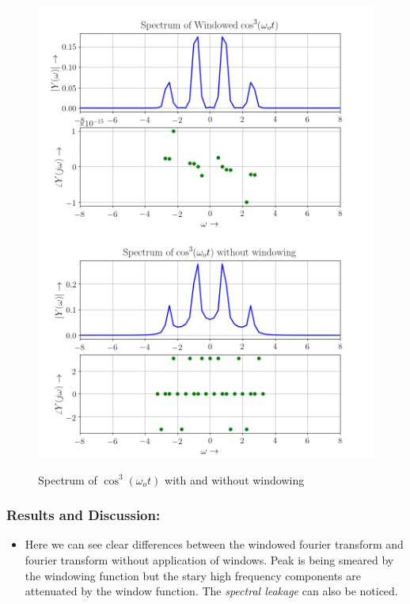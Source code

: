 \documentclass[11pt, a4paper]{article}
\begin{document}
  \newpage
  \begin{figure}[!tbh]
    \centering
    \includegraphics[scale=0.6]{./../Extras/fig10-8.png}  %
    \includegraphics[scale=0.6]{./../Extras/fig10-9.png}  %
    \caption{Spectrum of $\cos^3(\omega_o t)$ with and without windowing}
  \end{figure}
  \newpage
  \subsubsection{Results and Discussion:}\label{results-and-discussion}

  \begin{itemize}
  \item
    Here we can see clear differences between the windowed fourier
    transform and fourier transform without application of windows. Peak
    is being smeared by the windowing function but the stary high
    frequency components are attenuated by the window function. The
    \emph{spectral leakage} can also be noticed.
  \end{itemize}
  \newpage
\end{document}
